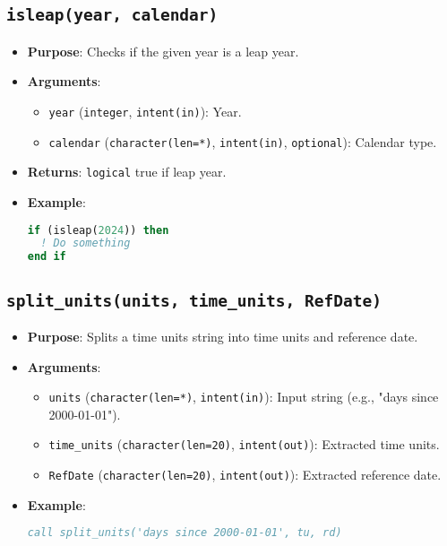 \documentclass[12pt,a4paper]{report}
\begin{document}
\subsection{\texttt{isleap(year, calendar)}}
\begin{itemize}
\item \textbf{Purpose}: Checks if the given year is a leap year.
\item \textbf{Arguments}:
\begin{itemize}
\item \texttt{year} (\texttt{integer}, \texttt{intent(in)}): Year.
\item \texttt{calendar} (\texttt{character(len=*)}, \texttt{intent(in)}, \texttt{optional}): Calendar type.
\end{itemize}
\item \textbf{Returns}: \texttt{logical} true if leap year.
\item \textbf{Example}:
\begin{lstlisting}[language=Fortran]
if (isleap(2024)) then
  ! Do something
end if
\end{lstlisting}
\end{itemize}

\subsection{\texttt{split\_units(units, time\_units, RefDate)}}
\begin{itemize}
\item \textbf{Purpose}: Splits a time units string into time units and reference date.
\item \textbf{Arguments}:
\begin{itemize}
\item \texttt{units} (\texttt{character(len=*)}, \texttt{intent(in)}): Input string (e.g., "days since 2000-01-01").
\item \texttt{time\_units} (\texttt{character(len=20)}, \texttt{intent(out)}): Extracted time units.
\item \texttt{RefDate} (\texttt{character(len=20)}, \texttt{intent(out)}): Extracted reference date.
\end{itemize}
\item \textbf{Example}:
\begin{lstlisting}[language=Fortran]
call split_units('days since 2000-01-01', tu, rd)
\end{lstlisting}
\end{itemize}
\end{document}
